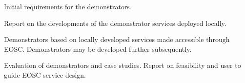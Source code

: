 \begin{workpackage}
\begin{wpdescription}
\end{wpdescription}

\begin{tasklist}
% 








\end{tasklist}



\begin{wpdelivs}

  \begin{wpdeliv}[due=12,miles=startup,id=codesign-support,dissem=PU,nature=R,lead=SRL]
    {Initial requirements for the demonstrators.}
  \end{wpdeliv}

  \begin{wpdeliv}[due=24,miles=prototype,id=local-services,dissem=PU,nature=R,lead=EP]
    {Report on the developments of the demonstrator services deployed locally.}
  \end{wpdeliv}

  \begin{wpdeliv}[due=36,miles=community,id=demonstrators,dissem=PU,nature=DEM,lead=EGI]
    {Demonstrators based on locally developed services made accessible
      through EOSC. Demonstrators may be developed further subsequently.}
  \end{wpdeliv}

  \begin{wpdeliv}[due=48,miles=final,id=applications-report,dissem=PU,nature=R,lead=XFEL]
    {Evaluation of demonstrators and case studies. Report on
      feasibility and user to guide EOSC service design.}
  \end{wpdeliv}

\end{wpdelivs}
\end{workpackage}

